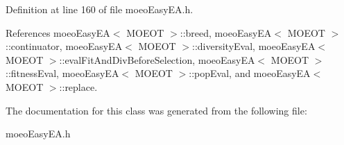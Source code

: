 Definition at line 160 of file moeo\-Easy\-EA.h.

References moeo\-Easy\-EA$<$ MOEOT $>$::breed, moeo\-Easy\-EA$<$ MOEOT $>$::continuator, moeo\-Easy\-EA$<$ MOEOT $>$::diversity\-Eval, moeo\-Easy\-EA$<$ MOEOT $>$::eval\-Fit\-And\-Div\-Before\-Selection, moeo\-Easy\-EA$<$ MOEOT $>$::fitness\-Eval, moeo\-Easy\-EA$<$ MOEOT $>$::pop\-Eval, and moeo\-Easy\-EA$<$ MOEOT $>$::replace.

The documentation for this class was generated from the following file:\begin{CompactItemize}
\item 
moeo\-Easy\-EA.h\end{CompactItemize}
